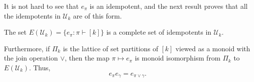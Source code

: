 \documentclass[ALCO,Unicode]{cedram}
\begin{document}
It is not hard to see that $e_\pi$ is an idempotent, and the
next result proves that all the idempotents in $\mathcal{U}_k$
are of this form.

\begin{lemma} \label{lem:idempotents}
The set $E(\mathcal{U}_k) = \{e_\pi : \pi \vdash [k] \}$ is a complete set of idempotents in $\mathcal{U}_k$.

Furthermore, if $\Pi_k$ is the lattice of set partitions of $[k]$ viewed as a monoid with the join operation $\vee$,
then the map $\pi \mapsto e_\pi$ is monoid isomorphism from $\Pi_k$ to $E(\mathcal{U}_k)$. Thus,
\begin{equation*}
    e_\pi e_\gamma = e_{\pi \vee \gamma}.
\end{equation*}
\end{lemma}
\end{document}

